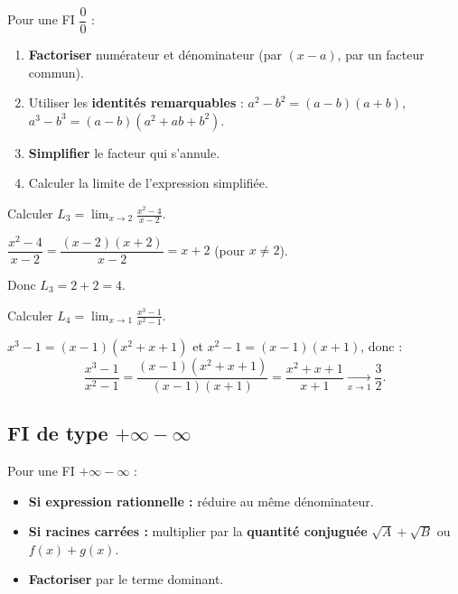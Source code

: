 \begin{methode}
	Pour une FI $\dfrac{0}{0}$ :
	\begin{enumerate}
		\item \textbf{Factoriser} numérateur et dénominateur
		(par $(x-a)$, par un facteur commun).
		\item Utiliser les \textbf{identités remarquables} :
		$a^2-b^2=(a-b)(a+b)$, $a^3-b^3=(a-b)(a^2+ab+b^2)$.
		\item \textbf{Simplifier} le facteur qui s'annule.
		\item Calculer la limite de l'expression simplifiée.
	\end{enumerate}
\end{methode}

\begin{exemple}
	Calculer $\displaystyle L_3=\lim_{x\to 2}\frac{x^2-4}{x-2}$.
	
	$\dfrac{x^2-4}{x-2} = \dfrac{(x-2)(x+2)}{x-2} = x+2$
	\quad (pour $x\neq 2$).
	
	Donc $L_3 = 2+2 = 4$.
\end{exemple}

\begin{exemple}
	Calculer $\displaystyle L_4=\lim_{x\to 1}\frac{x^3-1}{x^2-1}$.
	
	$x^3-1=(x-1)(x^2+x+1)$ et $x^2-1=(x-1)(x+1)$, donc :
	\[
	\frac{x^3-1}{x^2-1}
	= \frac{(x-1)(x^2+x+1)}{(x-1)(x+1)}
	= \frac{x^2+x+1}{x+1} \xrightarrow[x\to 1]{} \frac{3}{2}.
	\]
\end{exemple}

\subsection{FI de type \texorpdfstring{$+\infty - \infty$}{inf - inf}}

\begin{methode}
	Pour une FI $+\infty-\infty$ :
	\begin{itemize}
		\item \textbf{Si expression rationnelle :} réduire au même dénominateur.
		\item \textbf{Si racines carrées :} multiplier par la \textbf{quantité conjuguée}
		$\sqrt{A}+\sqrt{B}$ ou $f(x)+g(x)$.
		\item \textbf{Factoriser} par le terme dominant.
	\end{itemize}
\end{methode}

